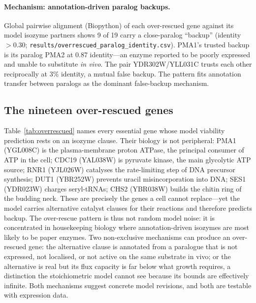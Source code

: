 \documentclass[12pt]{article}
\begin{document}
\paragraph{Mechanism: annotation-driven paralog backups.}
Global pairwise alignment (Biopython) of each over-rescued gene against
its model isozyme partners shows 9 of 19 carry a close-paralog
``backup'' (identity $>0.30$; \texttt{results/overrescued\_paralog\_identity.csv}).
PMA1's trusted backup is its paralog PMA2 at 0.87 identity---an enzyme
reported to be poorly expressed and unable to substitute \emph{in vivo}.
The pair YDR302W/YLL031C trusts each other reciprocally at 3\% identity,
a mutual false backup. The pattern fits annotation transfer between
paralogs as the dominant false-backup mechanism.
\subsection{The nineteen over-rescued genes}
\label{sec:nineteen}
Table~\ref{tab:overrescued} names every essential gene whose model
viability prediction rests on an isozyme clause. Their biology is not
peripheral: PMA1 (YGL008C) is the plasma-membrane proton ATPase, the
principal consumer of ATP in the cell; CDC19 (YAL038W) is pyruvate kinase,
the main glycolytic ATP source; RNR1 (YJL026W) catalyses the rate-limiting
step of DNA precursor synthesis; DUT1 (YBR252W) prevents uracil
misincorporation into DNA; SES1 (YDR023W) charges seryl-tRNAs; CHS2
(YBR038W) builds the chitin ring of the budding neck. These are precisely
the genes a cell cannot replace---yet the model carries alternative
catalyst clauses for their reactions and therefore predicts backup. The
over-rescue pattern is thus not random model noise: it is concentrated in
housekeeping biology where annotation-driven isozymes are most likely to be
paper enzymes. Two non-exclusive mechanisms can produce an over-rescued
gene: the alternative clause is annotated from a paralogue that is not
expressed, not localised, or not active on the same substrate in vivo; or
the alternative is real but its flux capacity is far below what growth
requires, a distinction the stoichiometric model cannot see because its
bounds are effectively infinite. Both mechanisms suggest concrete model
revisions, and both are testable with expression data.
\end{document}
